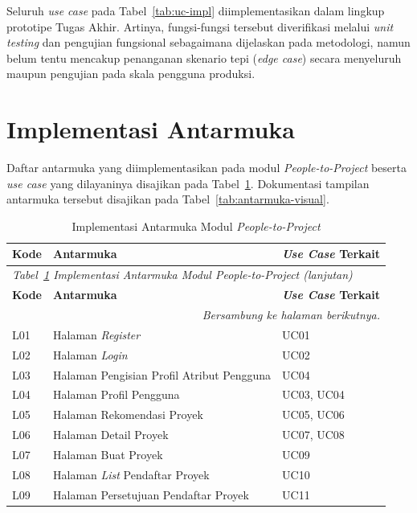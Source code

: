 Seluruh \emph{use case} pada Tabel~\ref{tab:uc-impl} diimplementasikan dalam lingkup prototipe Tugas Akhir. Artinya, fungsi-fungsi tersebut diverifikasi melalui \emph{unit testing} dan pengujian fungsional sebagaimana dijelaskan pada metodologi, namun belum tentu mencakup penanganan skenario tepi (\emph{edge case}) secara menyeluruh maupun pengujian pada skala pengguna produksi.

\section{Implementasi Antarmuka}

Daftar antarmuka yang diimplementasikan pada modul \emph{People-to-Project} beserta \emph{use case} yang dilayaninya disajikan pada Tabel~\ref{tab:antarmuka-impl}. Dokumentasi tampilan antarmuka tersebut disajikan pada Tabel~\ref{tab:antarmuka-visual}.

\begin{longtable}{p{1.5cm} p{7cm} >{\raggedright\arraybackslash}p{\dimexpr\linewidth-8.5cm-6\tabcolsep\relax}}
  \caption{Implementasi Antarmuka Modul \emph{People-to-Project}}
  \label{tab:antarmuka-impl} \\
  \toprule
    \textbf{Kode} & \textbf{Antarmuka} & \textbf{\emph{Use Case} Terkait} \\
  \midrule
  \endfirsthead
  \multicolumn{3}{l}{\small\textit{Tabel~\ref{tab:antarmuka-impl} Implementasi Antarmuka Modul \emph{People-to-Project} (lanjutan)}} \\
  \toprule
    \textbf{Kode} & \textbf{Antarmuka} & \textbf{\emph{Use Case} Terkait} \\
  \midrule
  \endhead
  \bottomrule
  \multicolumn{3}{r}{\textit{Bersambung ke halaman berikutnya.}} \\
  \endfoot
  \bottomrule
  \endlastfoot
    L01 & Halaman \emph{Register} & UC01 \\
    \midrule
    L02 & Halaman \emph{Login} & UC02 \\
    \midrule
    L03 & Halaman Pengisian Profil Atribut Pengguna & UC04 \\
    \midrule
    L04 & Halaman Profil Pengguna & UC03, UC04 \\
    \midrule
    L05 & Halaman Rekomendasi Proyek & UC05, UC06 \\
    \midrule
    L06 & Halaman Detail Proyek & UC07, UC08 \\
    \midrule
    L07 & Halaman Buat Proyek & UC09 \\
    \midrule
    L08 & Halaman \emph{List} Pendaftar Proyek & UC10 \\
    \midrule
    L09 & Halaman Persetujuan Pendaftar Proyek & UC11 \\
\end{longtable}

